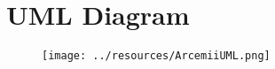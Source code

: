\documentclass[../main.tex]{subfiles}
\begin{document}
\pagebreak

\section{UML Diagram}
	\begin{figure}[H]
    	\centering
    	\texttt{[image: ../resources/ArcemiiUML.png]}
    \end{figure}
\end{document}

